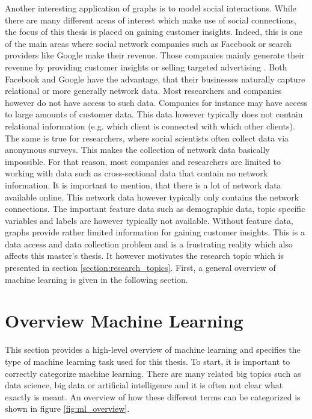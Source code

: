 	\noindent Another interesting application of graphs is to model social 
	interactions. While there are many different areas of interest which make
	use of social connections, the focus of this thesis is placed on gaining 
	customer insights. Indeed, this is one of the main areas where social network 
	companies such as Facebook or search providers like Google make their
	revenue. Those companies mainly generate their revenue by providing customer 
	insights or selling targeted advertising \citep{Facebook2021,Alphabet2021}. 
	Both Facebook and Google have the advantage, that their businesses naturally 
	capture relational or more generally network data. Most researchers and 
	companies however do not have access to such data. Companies for instance 
	may have access to large amounts of customer data. This data however 
	typically does not contain relational information (e.g. which client is 
	connected with which other clients). The same is true for researchers, where 
	social scientists often collect data via anonymous surveys. This makes the 
	collection of network data basically impossible. For that reason, most 
	companies and researchers are limited to working with data such as 
	cross-sectional data that contain no network information. It is important 
	to mention, that there is a lot of network data available online. This 
	network data however typically only contains the network connections. The 
	important feature data such as demographic data, topic specific variables 
	and labels are however typically not available. Without feature data, graphs 
	provide rather limited information for gaining customer insights. 
	This is a data access and data collection problem and is a frustrating 
	reality which also affects this master's thesis. It however motivates the 
	research topic which is presented in section \ref{section:research_topics}. 
	First, a general overview of machine learning is given in the following 
	section.
	
	\section{Overview Machine Learning}

	This section provides a high-level overview of machine learning and
	specifies the type of machine learning task used for this thesis. To
	start, it is important to correctly categorize machine learning. There are
	many related big topics such as data science, big data or artificial
	intelligence and it is often not clear what exactly is meant. An overview
	of how these different terms can be categorized is shown in figure 
	\ref{fig:ml_overview}.


